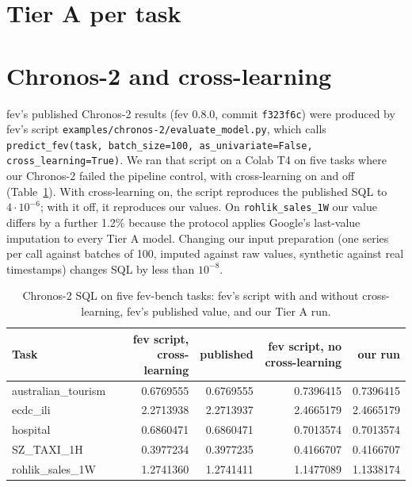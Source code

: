 \section{Tier A per task}
\label{app:tiera}

\begin{table}[h]
\centering
\caption{Tier A, \texttt{tfm3-eval}: our SQL and Google's published SQL per task, relative deviations of SQL and MASE, pipeline
controls (Seasonal Naive and Chronos-2), and SQL relative to fev's published statistical ensemble.}
\scriptsize
\setlength{\tabcolsep}{3pt}

\end{table}

\section{Chronos-2 and cross-learning}
\label{app:chronos}

fev's published Chronos-2 results (fev 0.8.0, commit \texttt{f323f6c}) were produced by fev's script
\texttt{examples/chronos-2/evaluate\_model.py}, which calls \texttt{predict\_fev(task, batch\_size=100, as\_univariate=False,
cross\_learning=True)}. We ran that script on a Colab T4 on five tasks where our Chronos-2 failed the pipeline control, with
cross-learning on and off (Table~\ref{tab:chronos}). With cross-learning on, the script reproduces the published SQL to
$4\cdot10^{-6}$; with it off, it reproduces our values. On \texttt{rohlik\_sales\_1W} our value differs by a further 1.2\% because
the protocol applies Google's last-value imputation to every Tier A model. Changing our input preparation (one series per call
against batches of 100, imputed against raw values, synthetic against real timestamps) changes SQL by less than $10^{-8}$.

\begin{table}[h]
\centering
\caption{Chronos-2 SQL on five fev-bench tasks: fev's script with and without cross-learning, fev's published value, and our Tier A
run.}
\label{tab:chronos}
\small
\begin{tabular}{lrrrr}
\toprule
Task & fev script, cross-learning & published & fev script, no cross-learning & our run \\
\midrule
australian\_tourism & 0.6769555 & 0.6769555 & 0.7396415 & 0.7396415 \\
ecdc\_ili & 2.2713938 & 2.2713937 & 2.4665179 & 2.4665179 \\
hospital & 0.6860471 & 0.6860471 & 0.7013574 & 0.7013574 \\
SZ\_TAXI\_1H & 0.3977234 & 0.3977235 & 0.4166707 & 0.4166707 \\
rohlik\_sales\_1W & 1.2741360 & 1.2741411 & 1.1477089 & 1.1338174 \\
\bottomrule
\end{tabular}
\end{table}

